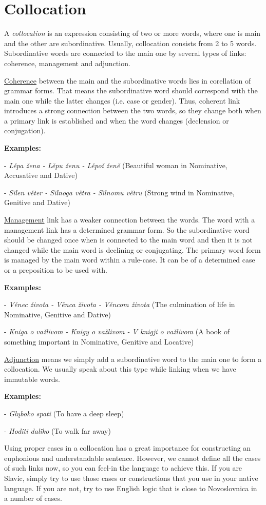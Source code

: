 \section{Collocation}

A \textit{collocation} is an expression consisting of two or more words, where one is main and the other are subordinative. \cite{colloc} Usually, collocation consists from 2 to 5 words. Subordinative words are connected to the main one by several types of links: coherence, management and adjunction.

\underline{Coherence} between the main and the subordinative words lies in corellation of grammar forms. That means the subordinative word should correspond with the main one while the latter changes (i.e. case or gender). Thus, coherent link introduces a strong connection between the two words, so they change both when a primary link is established and when the word changes (declension or conjugation).

\textbf{Examples:}

- \textit{Lěpa žena - Lěpu ženu - Lěpoǐ ženě} (Beautiful woman in Nominative, Accusative and Dative)

- \textit{Sïlen věter - Sïlnoga větra - Sïlnomu větru} (Strong wind in Nominative, Genitive and Dative)

\underline{Management} link has a weaker connection between the words. The word with a management link has a determined grammar form. So the subordinative word should be changed once when is connected to the main word and then it is not changed while the main word is declining or conjugating. The primary word form is managed by the main word within a rule-case. It can be of a determined case or a preposition to be used with.

\textbf{Examples:}

- \textit{Věnec života - Věnca života - Věncom života} (The culmination of life in Nominative, Genitive and Dative)

- \textit{Kniga o važlivom - Knigy o važlivom - V knigji o važlivom} (A book of something important in Nominative, Genitive and Locative)

\underline{Adjunction} means we simply add a subordinative word to the main one to form a collocation. We usually speak about this type while linking when we have immutable words.

\textbf{Examples:}

- \textit{Glųboko spati} (To have a deep sleep)

- \textit{Hoditi dalïko} (To walk far away)

Using proper cases in a collocation has a great importance for constructing an euphonious and understandable sentence. However, we cannot define all the cases of such links now, so you can feel-in the language to achieve this. If you are Slavic, simply try to use those cases or constructions that you use in your native language. If you are not, try to use English logic that is close to Novoslovnica in a number of cases.